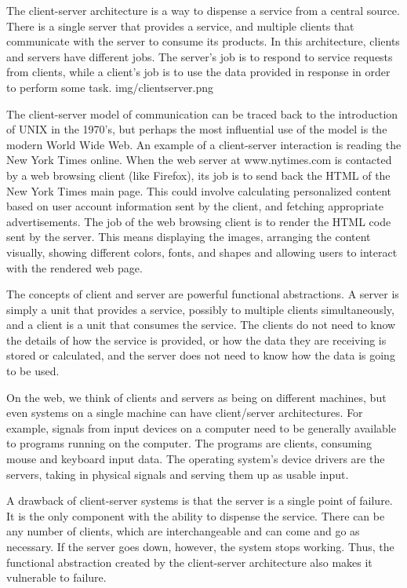 \documentclass[letterpaper,10pt,dvipdfmx]{sphinxmanual}
\begin{document}
The client-server architecture is a way to dispense a service from a central source. There is a single server that provides a service, and multiple clients that communicate with the server to consume its products. In this architecture, clients and servers have different jobs. The server's job is to respond to service requests from clients, while a client's job is to use the data provided in response in order to perform some task.
img/clientserver.png

The client-server model of communication can be traced back to the introduction of UNIX in the 1970's, but perhaps the most influential use of the model is the modern World Wide Web. An example of a client-server interaction is reading the New York Times online. When the web server at www.nytimes.com is contacted by a web browsing client (like Firefox), its job is to send back the HTML of the New York Times main page. This could involve calculating personalized content based on user account information sent by the client, and fetching appropriate advertisements. The job of the web browsing client is to render the HTML code sent by the server. This means displaying the images, arranging the content visually, showing different colors, fonts, and shapes and allowing users to interact with the rendered web page.

The concepts of client and server are powerful functional abstractions. A server is simply a unit that provides a service, possibly to multiple clients simultaneously, and a client is a unit that consumes the service. The clients do not need to know the details of how the service is provided, or how the data they are receiving is stored or calculated, and the server does not need to know how the data is going to be used.

On the web, we think of clients and servers as being on different machines, but even systems on a single machine can have client/server architectures. For example, signals from input devices on a computer need to be generally available to programs running on the computer. The programs are clients, consuming mouse and keyboard input data. The operating system's device drivers are the servers, taking in physical signals and serving them up as usable input.

A drawback of client-server systems is that the server is a single point of failure. It is the only component with the ability to dispense the service. There can be any number of clients, which are interchangeable and can come and go as necessary. If the server goes down, however, the system stops working. Thus, the functional abstraction created by the client-server architecture also makes it vulnerable to failure.
\end{document}
